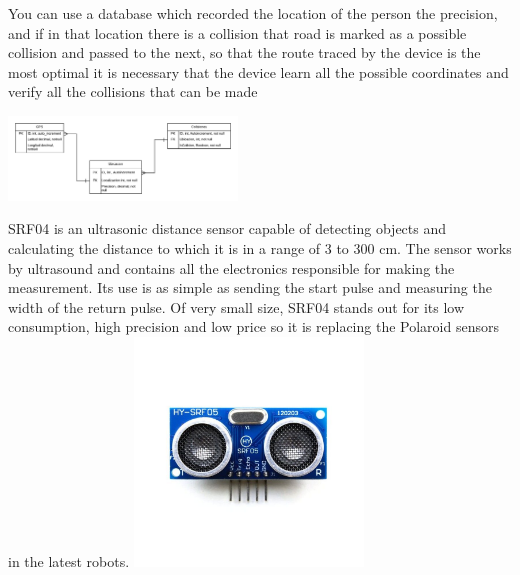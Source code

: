 \documentclass[11pt,a4paper,twocolumn]{article}
\begin{document}
\subtitle{
\textbf{Data Base}
}
You can use a database which recorded the location of the person the precision, and if in that location there is a collision that road is marked as a possible collision and passed to the next, so that the route traced by the device is the most optimal it is necessary that the device learn all the possible coordinates and verify all the collisions that can be made

\includegraphics[width=230]{database}

\subtitle{
\textbf{Distance Sensor}
}
SRF04 is an ultrasonic distance sensor capable of detecting objects and calculating the distance to which it is in a range of 3 to 300 cm. The sensor works by ultrasound and contains all the electronics responsible for making the measurement. Its use is as simple as sending the start pulse and measuring the width of the return pulse. Of very small size, SRF04 stands out for its low consumption, high precision and low price so it is replacing the Polaroid sensors in the latest robots.
\includegraphics[width=230]{sensor}
\end{document}
